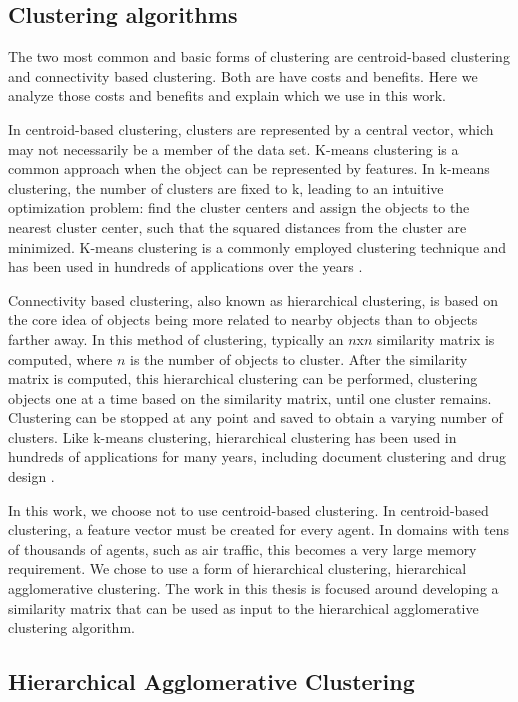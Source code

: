 \documentclass[onehalf,11pt]{beavtex}
\begin{document}
\subsection{Clustering algorithms}

The two most common and basic forms of clustering are centroid-based clustering and connectivity based clustering. Both are have costs and benefits. Here we analyze those costs and benefits and explain which we use in this work.  

In centroid-based clustering, clusters are represented by a central vector, which may not necessarily be a member of the data set. K-means clustering is a common approach when the object can be represented by features. In k-means clustering, the number of clusters are fixed to k, leading to an intuitive optimization problem: find the cluster centers and assign the objects to the nearest cluster center, such that the squared distances from the cluster are minimized. K-means clustering is a commonly employed clustering technique and has been used in hundreds of applications over the years \cite{Jain:2010:DCY:1755267.1755654}.

Connectivity based clustering, also known as hierarchical clustering, is based on the core idea of objects being more related to nearby objects than to objects farther away. In this method of clustering, typically an $n$x$n$ similarity matrix is computed, where $n$ is the number of objects to cluster. After the similarity matrix is computed, this hierarchical clustering can be performed, clustering objects one at a time based on the similarity matrix, until one cluster remains. Clustering can be stopped at any point and saved to obtain a varying number of clusters. Like k-means clustering, hierarchical clustering has been used in hundreds of applications for many years, including document clustering \cite{Zhao:2002:EHC:584792.584877} and drug design \cite{Bottegoni15072006}.

In this work, we choose not to use centroid-based clustering. In centroid-based clustering, a feature vector must be created for every agent. In domains with tens of thousands of agents, such as air traffic, this becomes a very large memory requirement. We chose to use a form of hierarchical clustering, hierarchical agglomerative clustering. The work in this thesis is focused around developing a similarity matrix that can be used as input to the hierarchical agglomerative clustering algorithm.

\subsection{Hierarchical Agglomerative Clustering}
 
\end{document}
